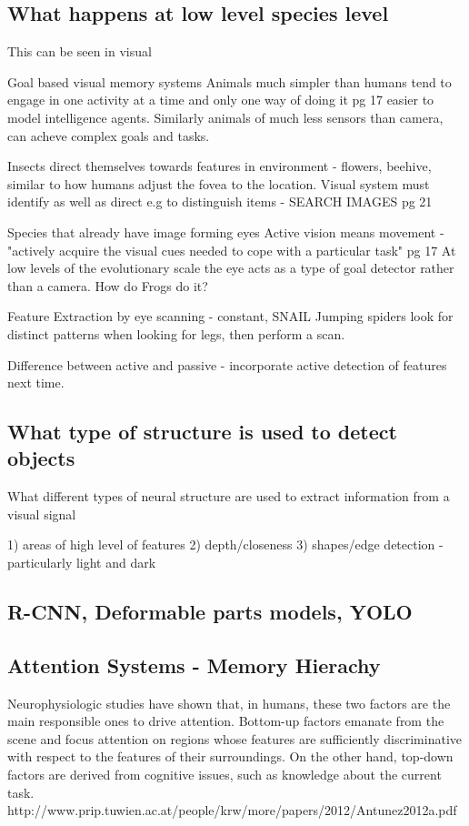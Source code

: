 \documentclass{mproj}
\begin{document}
\subsection{What happens at low level species level}
This can be seen in visual 


Goal based visual memory systems
  Animals much simpler than humans tend to engage in one activity at a time and only one way of doing it pg 17 easier to model intelligence agents. Similarly animals of much less sensors than camera, can acheve complex goals and tasks.
  
  Insects direct themselves towards features in environment - flowers, beehive, similar to how humans adjust the fovea to the location. 
  Visual system must identify as well as direct e.g to distinguish items - SEARCH IMAGES pg 21
  
  
  Species that already have image forming eyes
  Active vision means movement - "actively acquire the visual cues needed to cope with a particular task" pg 17
  At low levels of the evolutionary scale the eye acts as a type of goal detector rather than a camera. 
  How do Frogs do it?
  
  Feature Extraction by eye scanning - constant, SNAIL
  Jumping spiders look for distinct patterns when looking for legs, then perform a scan.
  
  Difference between active and passive - incorporate active detection of features next time.


\subsection{What type of structure is used to detect objects}

What different types of neural structure are used to extract information from a visual signal

1) areas of high level of features
2) depth/closeness
3) shapes/edge detection - particularly light and dark

\subsection{R-CNN, Deformable parts models, YOLO}

\subsection{Attention Systems - Memory Hierachy}

Neurophysiologic studies have shown that, in humans, these two 
factors are the main responsible ones to drive attention. Bottom-up factors emanate from the scene and 
focus attention on regions whose features are sufficiently discriminative with respect to the features 
of their surroundings. On the other hand, top-down factors are derived from cognitive issues, such as 
knowledge about the current task.
http://www.prip.tuwien.ac.at/people/krw/more/papers/2012/Antunez2012a.pdf
\end{document}
